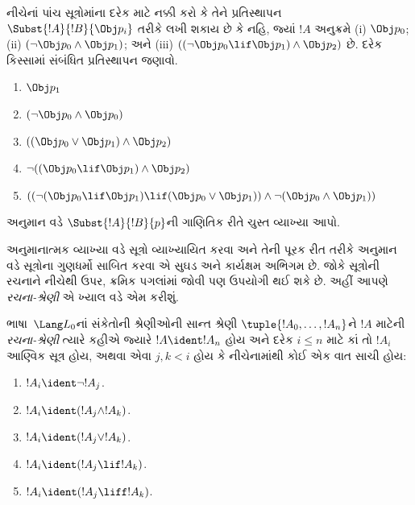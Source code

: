 \begin{prob} નીચેનાં પાંચ સૂત્રોમાંના દરેક માટે નક્કી કરો કે
 તેને પ્રતિસ્થાપન \( \Subst{!A}{!B}{\Obj p_i} \) તરીકે લખી શકાય છે કે નહિ,
 જ્યાં \( !A \) અનુક્રમે (i) \( \Obj p_0 \); (ii) \( ( \lnot \Obj p_0 \land \Obj
 p_1) \); અને (iii) \( ( ( \lnot \Obj p_0 \lif \Obj p_1 ) \land \Obj
 p_2 ) \) છે. દરેક કિસ્સામાં સંબંધિત પ્રતિસ્થાપન જણાવો.
  \begin{enumerate}
    \item \( \Obj p_1 \)
    \item \( ( \lnot \Obj p_0 \land \Obj p_0 ) \)
    \item \( ( ( \Obj p_0 \lor \Obj p_1 ) \land \Obj p_2 )  \)
    \item \( \lnot ( ( \Obj p_0 \lif \Obj p_1 ) \land \Obj p_2 ) \)
    \item \( (( \lnot ( \Obj p_0 \lif \Obj p_1 ) \lif ( \Obj p_0 \lor \Obj p_1 )) \land \lnot ( \Obj p_0 \land \Obj p_1 )) \)
  \end{enumerate}
\end{prob}

\begin{prob}
અનુમાન વડે $\Subst{!A}{!B}{p}$ની ગાણિતિક રીતે ચુસ્ત વ્યાખ્યા આપો.
\end{prob}
\endgroup


\begingroup
\makeatletter{}\makeatother


\label{guunit:OLP-0060}


અનુમાનાત્મક વ્યાખ્યા વડે સૂત્રો વ્યાખ્યાયિત કરવા અને તેની
પૂરક રીત તરીકે અનુમાન વડે સૂત્રોના ગુણધર્મો સાબિત કરવા એ
સુઘડ અને કાર્યક્ષમ અભિગમ છે. જોકે સૂત્રોની રચનાને નીચેથી ઉપર,
ક્રમિક પગલાંમાં જોવી પણ ઉપયોગી થઈ શકે છે. અહીં આપણે \emph{રચના-શ્રેણી}
એ ખ્યાલ વડે એમ કરીશું.

\begin{defn}[સૂત્રો માટેની રચના-શ્રેણીઓ]
ભાષા~$\Lang L_0$નાં સંકેતોની શ્રેણીઓની સાન્ત શ્રેણી
$\tuple{!A_0,\dotsc,!A_n}$ને $!A$ માટેની \emph{રચના-શ્રેણી} ત્યારે
કહીએ જ્યારે $!A \ident !A_n$ હોય અને દરેક $i\leq n$ માટે કાં તો
$!A_i$ આણ્વિક સૂત્ર હોય, અથવા એવા $j,k<i$ હોય કે નીચેનામાંથી કોઈ
એક વાત સાચી હોય:
\begin{enumerate}
    \item $!A_i \ident \lnot !A_j$.%
    \item $!A_i \ident (!A_j \land !A_k)$.%
    \item $!A_i \ident (!A_j \lor !A_k)$.%
    \item $!A_i \ident (!A_j \lif !A_k)$.%
    \item $!A_i \ident (!A_j \liff !A_k)$.%
\end{enumerate}
\end{defn}

